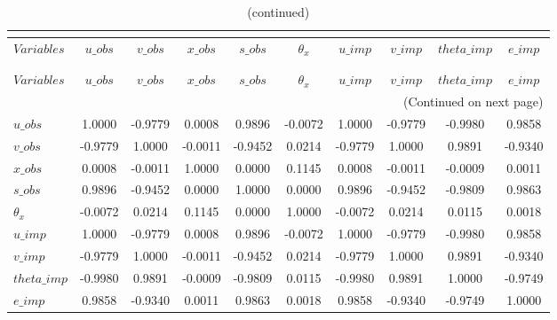  
\begin{center}
\begin{longtable}{lccccccccc} 
\caption{MATRIX OF CORRELATIONS}\\
 \label{Table:th_corr_matrix}\\
\toprule 
$Variables   $	 & 	 $       u\_obs$	 & 	 $       v\_obs$	 & 	 $       x\_obs$	 & 	 $       s\_obs$	 & 	 $   {\theta_x}$	 & 	 $       u\_imp$	 & 	 $       v\_imp$	 & 	 $   theta\_imp$	 & 	 $       e\_imp$\\
\midrule \endfirsthead 
\caption{(continued)}\\
 \toprule \\ 
$Variables   $	 & 	 $       u\_obs$	 & 	 $       v\_obs$	 & 	 $       x\_obs$	 & 	 $       s\_obs$	 & 	 $   {\theta_x}$	 & 	 $       u\_imp$	 & 	 $       v\_imp$	 & 	 $   theta\_imp$	 & 	 $       e\_imp$\\
\midrule \endhead 
\midrule \multicolumn{10}{r}{(Continued on next page)} \\ \bottomrule \endfoot 
\bottomrule \endlastfoot 
$u\_obs      $	 & 	        1.0000	 & 	       -0.9779	 & 	        0.0008	 & 	        0.9896	 & 	       -0.0072	 & 	        1.0000	 & 	       -0.9779	 & 	       -0.9980	 & 	        0.9858 \\ 
$v\_obs      $	 & 	       -0.9779	 & 	        1.0000	 & 	       -0.0011	 & 	       -0.9452	 & 	        0.0214	 & 	       -0.9779	 & 	        1.0000	 & 	        0.9891	 & 	       -0.9340 \\ 
$x\_obs      $	 & 	        0.0008	 & 	       -0.0011	 & 	        1.0000	 & 	        0.0000	 & 	        0.1145	 & 	        0.0008	 & 	       -0.0011	 & 	       -0.0009	 & 	        0.0011 \\ 
$s\_obs      $	 & 	        0.9896	 & 	       -0.9452	 & 	        0.0000	 & 	        1.0000	 & 	        0.0000	 & 	        0.9896	 & 	       -0.9452	 & 	       -0.9809	 & 	        0.9863 \\ 
${\theta_x}  $	 & 	       -0.0072	 & 	        0.0214	 & 	        0.1145	 & 	        0.0000	 & 	        1.0000	 & 	       -0.0072	 & 	        0.0214	 & 	        0.0115	 & 	        0.0018 \\ 
$u\_imp      $	 & 	        1.0000	 & 	       -0.9779	 & 	        0.0008	 & 	        0.9896	 & 	       -0.0072	 & 	        1.0000	 & 	       -0.9779	 & 	       -0.9980	 & 	        0.9858 \\ 
$v\_imp      $	 & 	       -0.9779	 & 	        1.0000	 & 	       -0.0011	 & 	       -0.9452	 & 	        0.0214	 & 	       -0.9779	 & 	        1.0000	 & 	        0.9891	 & 	       -0.9340 \\ 
$theta\_imp  $	 & 	       -0.9980	 & 	        0.9891	 & 	       -0.0009	 & 	       -0.9809	 & 	        0.0115	 & 	       -0.9980	 & 	        0.9891	 & 	        1.0000	 & 	       -0.9749 \\ 
$e\_imp      $	 & 	        0.9858	 & 	       -0.9340	 & 	        0.0011	 & 	        0.9863	 & 	        0.0018	 & 	        0.9858	 & 	       -0.9340	 & 	       -0.9749	 & 	        1.0000 \\ 
\end{longtable}
 \end{center}

